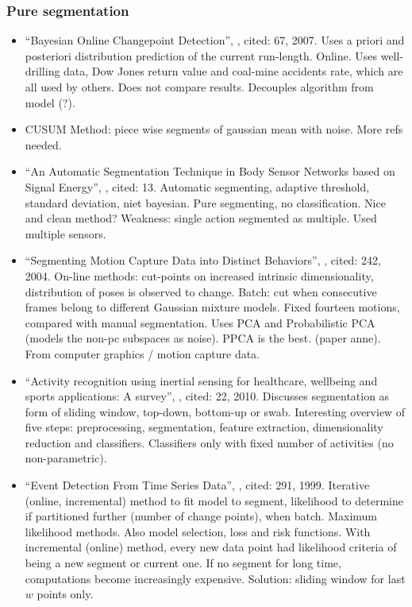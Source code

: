 \subsubsection{Pure segmentation}
\begin{itemize}
  \item ``Bayesian Online Changepoint Detection'', \cite{adams2007bayesian}, cited: 67, 2007. Uses a priori and posteriori distribution prediction of the current run-length. Online. Uses well-drilling data, Dow Jones return value and coal-mine accidents rate, which are all used by others. Does not compare results. Decouples algorithm from model (?).
  \item CUSUM Method: piece wise segments of gaussian mean with noise. More refs needed.
  \item ``An Automatic Segmentation Technique in Body Sensor Networks based on Signal Energy'', \cite{guenterberg2009automatic}, cited: 13. Automatic segmenting, adaptive threshold, standard deviation, niet bayesian. Pure segmenting, no classification. Nice and clean method? Weakness: single action segmented as multiple. Used multiple sensors.
  \item ``Segmenting Motion Capture Data into Distinct Behaviors'', \cite{barbivc2004segmenting}, cited: 242, 2004. On-line methods: cut-points on increased intrinsic dimensionality, distribution of poses is observed to change. Batch: cut when consecutive frames belong to different Gaussian mixture models. Fixed fourteen motions, compared with manual segmentation. Uses PCA and Probabilistic PCA (models the non-pc subspaces as noise). PPCA is the best. (paper anne). From computer graphics / motion capture data.
  \item ``Activity recognition using inertial sensing for healthcare, wellbeing and sports applications: A survey'', \cite{avci2010activity}, cited: 22, 2010. Discusses segmentation as form of sliding window, top-down, bottom-up or swab. Interesting overview of five steps: preprocessing, segmentation, feature extraction, dimensionality reduction and classifiers. Classifiers only with fixed number of activities (no non-parametric).
  \item ``Event Detection From Time Series Data'', \cite{guralnik1999event}, cited: 291, 1999. Iterative (online, incremental) method to fit model to segment, likelihood to determine if partitioned further (number of change points), when batch. Maximum likelihood methods. Also model selection, loss and risk functions. With incremental (online) method, every new data point had likelihood criteria of being a new segment or current one. If no segment for long time, computations become increasingly expensive. Solution: sliding window for last $w$ points only.

\end{itemize}
